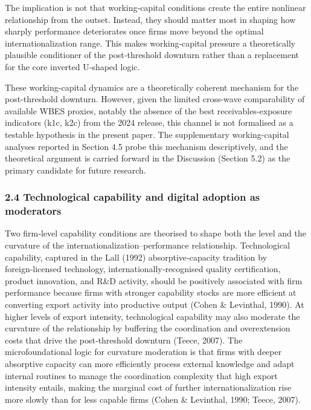 \documentclass[12pt,a4paper]{article}
\begin{document}
The implication is not that working‑capital conditions create the entire
nonlinear relationship from the outset. Instead, they should matter most
in shaping how sharply performance deteriorates once firms move beyond
the optimal internationalization range. This makes working‑capital
pressure a theoretically plausible conditioner of the post‑threshold
downturn rather than a replacement for the core inverted U‑shaped logic.

These working-capital dynamics are a theoretically coherent mechanism
for the post-threshold downturn. However, given the limited cross-wave
comparability of available WBES proxies, notably the absence of the best
receivables-exposure indicators (k1c, k2c) from the 2024 release, this
channel is not formalised as a testable hypothesis in the present paper.
The supplementary working-capital analyses reported in Section 4.5 probe
this mechanism descriptively, and the theoretical argument is carried
forward in the Discussion (Section 5.2) as the primary candidate for
future research.

\hypertarget{24-technological-capability-and-digital-adoption-as-moderators}{%
\subsubsection{2.4 Technological capability and digital adoption as
moderators}\label{24-technological-capability-and-digital-adoption-as-moderators}}

Two firm‑level capability conditions are theorised to shape both the
level and the curvature of the internationalization--performance
relationship. Technological capability, captured in the Lall (1992)
absorptive‑capacity tradition by foreign‑licensed technology,
internationally‑recognised quality certification, product innovation,
and R\&D activity, should be positively associated with firm performance
because firms with stronger capability stocks are more efficient at
converting export activity into productive output (Cohen \& Levinthal,
1990). At higher levels of export intensity, technological capability
may also moderate the curvature of the relationship by buffering the
coordination and overextension costs that drive the post‑threshold
downturn (Teece, 2007). The microfoundational logic for curvature
moderation is that firms with deeper absorptive capacity can more
efficiently process external knowledge and adapt internal routines to
manage the coordination complexity that high export intensity entails,
making the marginal cost of further internationalization rise more
slowly than for less capable firms (Cohen \& Levinthal, 1990; Teece,
2007).
\end{document}
